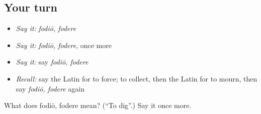 \subsection*{Your turn}
\begin{itemize}
\raggedright
  \item \emph{Say it:} \emph{fodiō, fodere}
  \item \emph{Say it:} \emph{fodiō, fodere}, once more
  \item \emph{Say it:} say \emph{fodiō, fodere}
  \item \emph{Recall:} say the Latin for to force; to collect, then the Latin for to mourn, then say \emph{fodiō, fodere} again
\end{itemize}

\begin{tcolorbox}[breakable,colback=teal!4,colframe=teal!35!black,title={Before you move on}]
What does fodiō, fodere mean? (\textquotedblleft{}To dig\textquotedblright{}.) Say it once more.
\end{tcolorbox}
